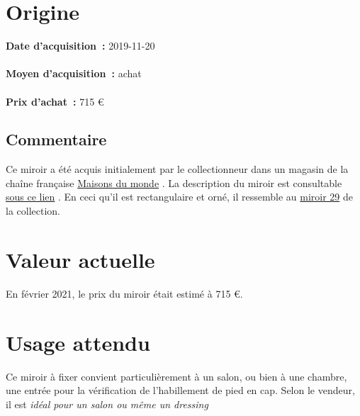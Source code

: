    \section* {Origine} 
    {\bf \large Date d’acquisition :} 2019-11-20 \\ \\
    {\bf \large Moyen d’acquisition :} achat \\ \\
     {\bf \large Prix d’achat :} 715 €  \subsection* {Commentaire}
     Ce miroir a été acquis initialement par le collectionneur dans un magasin de la
                chaîne française \href{http://www.maisonsdumonde.com/}{Maisons du
                    monde} . La description du miroir est consultable \href{http://www.maisonsdumonde.com/FR/fr/p/miroir-trumeau-en-resine-ivoire-70x150-M21017760.htm}{sous ce lien} .  En ceci qu'il est rectangulaire et orné, il ressemble au \href{miroir29.xml}{miroir 29}  de la collection.  \section* {Valeur actuelle}
    En février 2021, le prix du miroir était estimé à 715 €. \section* {Usage attendu}
     Ce miroir à fixer convient particulièrement à un salon, ou bien à une chambre, une entrée
            pour la vérification de l'habillement de pied en cap. Selon le vendeur, il est \em{idéal pour un salon ou même un dressing}   